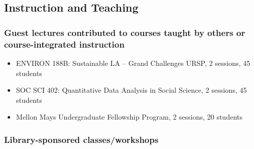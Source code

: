 

\subsection{Instruction and Teaching}

\subsubsection{Guest lectures contributed to courses taught by others or course-integrated instruction}

\begin{itemize}[label={}]
  \item ENVIRON 188B: Sustainable LA – Grand Challenges URSP, 2 sessions, 45 students
  \item SOC SCI 402: Quantitative Data Analysis in Social Science, 2 sessions, 45 students
  \item Mellon Mays Undergraduate Fellowship Program, 2 sessions, 20 students
\end{itemize}

\subsubsection{Library-sponsored classes/workshops}


